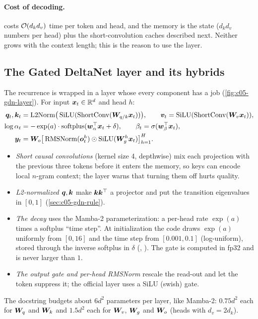 \paragraph{Cost of decoding.}  costs $\mathcal{O}(d_k d_v)$ time per token and head,
and the memory is the state ($d_k d_v$ numbers per head) plus the short-convolution caches
described next. Neither grows with the context length; this is the reason to use the layer.

\subsection{The Gated DeltaNet layer and its hybrids}\label{sec:c05-gdn-layer}

The recurrence is wrapped in a layer whose every component has a job (\cref{fig:c05-gdn-layer}).
For input $\bm{x}_t \in \mathbb{R}^d$ and head $h$:
\begin{align}
  \bm{q}_t, \bm{k}_t &= \mathrm{L2Norm}\big(\operatorname{SiLU}(\mathrm{ShortConv}(\bm{W}_{q/k}\bm{x}_t))\big),\qquad
  \bm{v}_t = \operatorname{SiLU}(\mathrm{ShortConv}(\bm{W}_v\bm{x}_t)), \label{eq:c05-gdn-qkv}\\
  \log\alpha_t &= -\exp(a)\cdot\mathrm{softplus}(\bm{w}_\alpha^{\top}\bm{x}_t + \delta),\qquad
  \beta_t = \sigma(\bm{w}_\beta^{\top}\bm{x}_t), \label{eq:c05-gdn-gates}\\
  \bm{y}_t &= \bm{W}_o\big[\operatorname{RMSNorm}(\bm{o}_t^{h})\odot\operatorname{SiLU}(\bm{W}_g^{h}\bm{x}_t)\big]_{h=1}^{H}. \label{eq:c05-gdn-out-gate}
\end{align}
\begin{itemize}
  \item \emph{Short causal convolutions} (kernel size 4, depthwise) mix each projection with the
  previous three tokens before it enters the memory, so keys can encode local $n$-gram context;
  the \fla{} layer warns that turning them off hurts quality.
  \item \emph{L2-normalized $\bm{q},\bm{k}$} make $\bm{k}\bm{k}^{\top}$ a projector and put the transition
  eigenvalues in $[0,1]$ (\cref{sec:c05-gdn-rule}).
  \item \emph{The decay} uses the Mamba-2 parameterization: a per-head rate $\exp(a)$ times a
  softplus ``time step''. At initialization the code draws $\exp(a)$ uniformly from $[0,16]$ and the
  time step from $[0.001, 0.1]$ (log-uniform), stored through the inverse softplus in $\delta$
  (, ). The gate is computed in fp32 and is never larger than $1$.
  \item \emph{The output gate and per-head RMSNorm} rescale the read-out and let the token suppress
  it; the official layer uses a SiLU (swish) gate.
\end{itemize}
The \fla{} docstring budgets about $6d^2$ parameters per layer, like Mamba-2: $0.75d^2$ each for
$\bm{W}_q$ and $\bm{W}_k$ and $1.5d^2$ each for $\bm{W}_v$, $\bm{W}_g$ and $\bm{W}_o$ (heads with
$d_v = 2d_k$).


